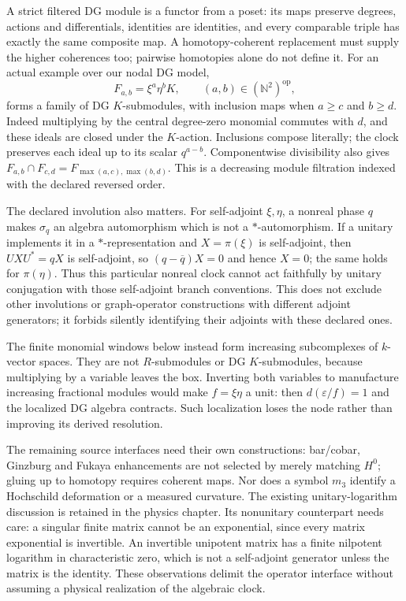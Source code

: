 A strict filtered DG module is a functor from a poset: its maps preserve
degrees, actions and differentials, identities are identities, and every
comparable triple has exactly the same composite map. A homotopy-coherent
replacement must supply the higher coherences too; pairwise homotopies
alone do not define it. For an actual example over our nodal DG model,
\[
 F_{a,b}=\xi^a\eta^b K,\qquad (a,b)\in(\mathbb N^2)^{\mathrm{op}},
\]
forms a family of DG $K$-submodules, with inclusion maps when
$a\ge c$ and $b\ge d$. Indeed multiplying by the central degree-zero
monomial commutes with $d$, and these ideals are closed under the $K$-action.
Inclusions compose literally; the clock preserves each ideal up to its
scalar $q^{a-b}$. Componentwise divisibility also gives
$F_{a,b}\cap F_{c,d}=F_{\max(a,c),\max(b,d)}$. This is a decreasing
module filtration indexed with the declared reversed order.

The declared involution also matters. For self-adjoint $\xi,\eta$, a
nonreal phase $q$ makes $\sigma_q$ an algebra automorphism which is not a
$*$-automorphism. If a unitary implements it in a $*$-representation and
$X=\pi(\xi)$ is self-adjoint, then $UXU^*=qX$ is self-adjoint, so
$(q-\overline q)X=0$ and hence $X=0$; the same holds for $\pi(\eta)$.
Thus this particular nonreal clock cannot act faithfully by unitary
conjugation with those self-adjoint branch conventions. This does not
exclude other involutions or graph-operator constructions with different
adjoint generators; it forbids silently identifying their adjoints with
these declared ones.

The finite monomial windows below instead form increasing subcomplexes of
$k$-vector spaces. They are not $R$-submodules or DG $K$-submodules, because
multiplying by a variable leaves the box. Inverting both variables to
manufacture increasing fractional modules would make $f=\xi\eta$ a unit:
then $d(\varepsilon/f)=1$ and the localized DG algebra contracts. Such
localization loses the node rather than improving its derived resolution.

The remaining source interfaces need their own constructions: bar/cobar,
Ginzburg and Fukaya enhancements are not selected by merely matching $H^0$;
gluing up to homotopy requires coherent maps. Nor does a symbol $m_3$
identify a Hochschild deformation or a measured curvature. The existing
unitary-logarithm discussion is retained in the physics chapter. Its
nonunitary counterpart needs care: a singular finite matrix cannot be an
exponential, since every matrix exponential is invertible. An invertible
unipotent matrix has a finite nilpotent logarithm in characteristic zero,
which is not a self-adjoint generator unless the matrix is the identity.
These observations delimit the operator interface without assuming a
physical realization of the algebraic clock.


